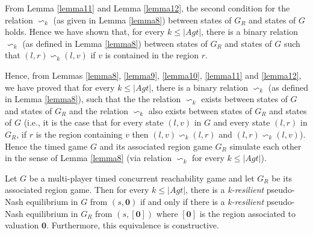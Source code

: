 From Lemma \ref{lemma11} and Lemma \ref{lemma12}, the second condition for the relation $\backsim_{k}$ (as given in Lemma \ref{lemma8}) between states of $G_{R}$ and states of $G$ holds. Hence we have shown that, for every $k \leq \vert Agt \vert$, there is a binary relation $\backsim_{k}$ (as defined in Lemma \ref{lemma8}) between states of $G_{R}$ and states of $G$ such that $(l, r) \backsim_{k} (l, v)$ if $v$ is contained in the region $r$.

Hence, from Lemmas \ref{lemma8}, \ref{lemma9}, \ref{lemma10}, \ref{lemma11} and \ref{lemma12}, we have proved that for every $k \leq \vert Agt \vert$, there is a binary relation $\backsim_{k}$ (as defined in Lemma \ref{lemma8}), such that the the relation $\backsim_{k}$ exists between states of $G$ and states of $G_{R}$ and the relation $\backsim_{k}$ also exists between states of $G_{R}$ and states of $G$ (i.e., it is the case that for every state $(l, v)$ in $G$ and every state $(l, r)$ in $G_{R}$, if $r$ is the region containing $v$ then $(l, v) \backsim_{k} (l, r)$ and $(l, r) \backsim_{k} (l, v)$). Hence the timed game $G$ and its associated region game $G_{R}$ simulate each other in the sense of Lemma \ref{lemma8} (via relation $\backsim_{k}$ for every $k \leq \vert Agt \vert$).

\begin{theorem}
\label{theroem13}
Let $G$ be a multi-player timed concurrent reachability game and let $G_{R}$ be its associated region game. Then for every $k \leq \vert Agt \vert$, there is a \textit{k-resilient} pseudo-Nash equilibrium in $G$ from $(s, \textbf{0})$ if and only if there is a \textit{k-resilient} pseudo-Nash equilibrium in $G_{R}$ from $(s, [\textbf{0}])$ where $[\textbf{0}]$ is the region associated to valuation $\textbf{0}$. Furthermore, this equivalence is constructive.
\end{theorem}

